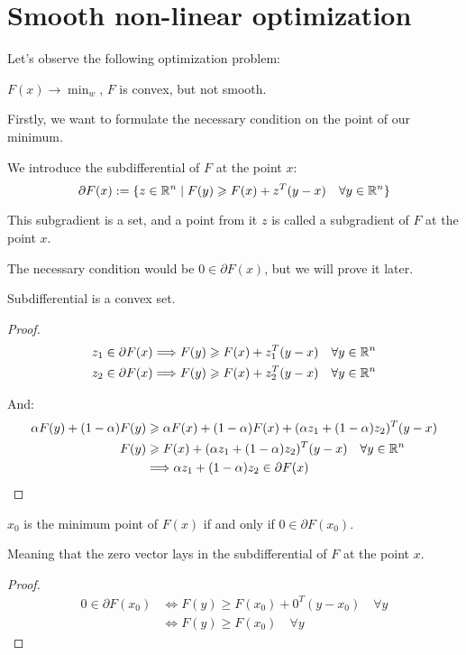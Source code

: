 \section{Smooth non-linear optimization}
Let's observe the following optimization problem:
\begin{center}
    $F(x) \to \min_w$, $F$ is convex, but not smooth.
\end{center}

Firstly, we want to formulate the necessary condition on the point of our minimum. 

We introduce the subdifferential of $F$ at the point $x$:
\[ 
    \partial F(x) := \{ z \in \mathbb{R}^n \mid F(y) \geqslant F(x) + z^T(y - x) \quad \forall y \in \mathbb{R}^n \}
\] 

This subgradient is a set, and a point from it $z$ is called a subgradient of $F$ at the point $x$.

The necessary condition would be $0 \in \partial F(x)$, but we will prove it later.

\begin{lemma}
    Subdifferential is a convex set.
\end{lemma}
\begin{proof}
    \begin{align*}
        z_1 \in \partial F(x) &\Longrightarrow F(y) \geqslant F(x) + z_1^T(y - x) \quad \forall y \in \mathbb{R}^n \\
        z_2 \in \partial F(x) &\Longrightarrow F(y) \geqslant F(x) + z_2^T(y - x) \quad \forall y \in \mathbb{R}^n
    \end{align*}

    And: 
    \begin{align*}
        \alpha F(y) + (1 - \alpha) F(y) &\geqslant \alpha F(x) + (1 - \alpha) F(x) + (\alpha z_1 + (1 - \alpha) z_2)^T(y - x) \\
        F(y) &\geqslant F(x) + (\alpha z_1 + (1 - \alpha) z_2)^T(y - x) \quad \forall y \in \mathbb{R}^n \\ 
             &\Longrightarrow \alpha z_1 + (1 - \alpha) z_2 \in \partial F(x)
    \end{align*}
\end{proof}

\begin{theorem} \; 

    \begin{center}
        $x_0$ is the minimum point of $F(x)$ if and only if $0 \in \partial F(x_0)$.
    \end{center}
    Meaning that the zero vector lays in the subdifferential of $F$ at the point $x$.
\end{theorem}
\begin{proof}
    \begin{align*}
        0 \in \partial F(x_0) &\Longleftrightarrow F(y) \geqslant F(x_0) + 0^T(y - x_0) \quad \forall y \\
                              &\Longleftrightarrow F(y) \geqslant F(x_0) \quad \forall y
    \end{align*}
\end{proof}

